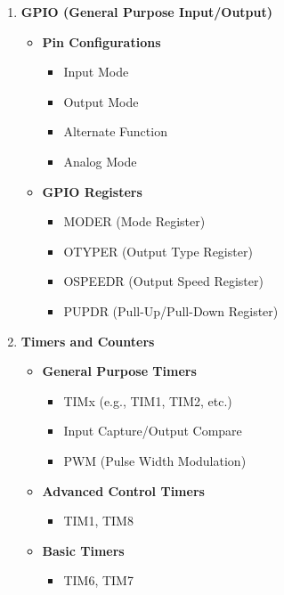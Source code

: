 \documentclass{article}
\begin{document}
\begin{enumerate}[label=\textbf{\arabic*.}]
    \item \textbf{GPIO (General Purpose Input/Output)}
    \begin{itemize}
        \item \textbf{Pin Configurations}
        \begin{itemize}
            \item Input Mode
            \item Output Mode
            \item Alternate Function
            \item Analog Mode
        \end{itemize}
        \item \textbf{GPIO Registers}
        \begin{itemize}
            \item MODER (Mode Register)
            \item OTYPER (Output Type Register)
            \item OSPEEDR (Output Speed Register)
            \item PUPDR (Pull-Up/Pull-Down Register)
        \end{itemize}
    \end{itemize}
    
    \item \textbf{Timers and Counters}
    \begin{itemize}
        \item \textbf{General Purpose Timers}
        \begin{itemize}
            \item TIMx (e.g., TIM1, TIM2, etc.)
            \item Input Capture/Output Compare
            \item PWM (Pulse Width Modulation)
        \end{itemize}
        \item \textbf{Advanced Control Timers}
        \begin{itemize}
            \item TIM1, TIM8
        \end{itemize}
        \item \textbf{Basic Timers}
        \begin{itemize}
            \item TIM6, TIM7
        \end{itemize}
    \end{itemize}
    

\end{enumerate}
\end{document}
